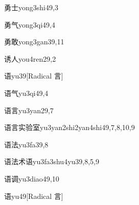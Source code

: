 \begin{verbete}{勇士}{yong3shi4}{9,3}
\end{verbete}

\begin{verbete}{勇气}{yong3qi4}{9,4}
\end{verbete}

\begin{verbete}{勇敢}{yong3gan3}{9,11}
\end{verbete}

\begin{verbete}{诱人}{you4ren2}{9,2}
\end{verbete}

\begin{verbete}{语}{yu3}{9}[Radical 言]
\end{verbete}

\begin{verbete}{语气}{yu3qi4}{9,4}
\end{verbete}

\begin{verbete}{语言}{yu3yan2}{9,7}
\end{verbete}

\begin{verbete}{语言实验室}{yu3yan2shi2yan4shi4}{9,7,8,10,9}
\end{verbete}

\begin{verbete}{语法}{yu3fa3}{9,8}
\end{verbete}

\begin{verbete}{语法术语}{yu3fa3shu4yu3}{9,8,5,9}
\end{verbete}

\begin{verbete}{语调}{yu3diao4}{9,10}
\end{verbete}

\begin{verbete}{语}{yu4}{9}[Radical 言]
\end{verbete}

